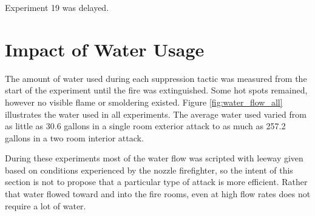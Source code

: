 \documentclass[12pt,oneside]{book}
\begin{document}
\begin{landscape}
\begin{table} [H]
\begin{tabular}
\end{tabular}
\end{table} 

Experiment 19 was delayed.  

\end{landscape}

\section{Impact of Water Usage}
The amount of water used during each suppression tactic was measured from the start of the experiment until the fire was extinguished. Some hot spots remained, however no visible flame or smoldering existed. Figure \ref{fig:water_flow_all} illustrates the water used in all experiments. The average water used varied from as little as 30.6 gallons in a single room exterior attack to as much as 257.2 gallons in a two room interior attack.

During these experiments most of the water flow was scripted with leeway given based on conditions experienced by the nozzle firefighter, so the intent of this section is not to propose that a particular type of attack is more efficient.  Rather that water flowed toward and into the fire rooms, even at high flow rates does not require a lot of water.
\end{document}
